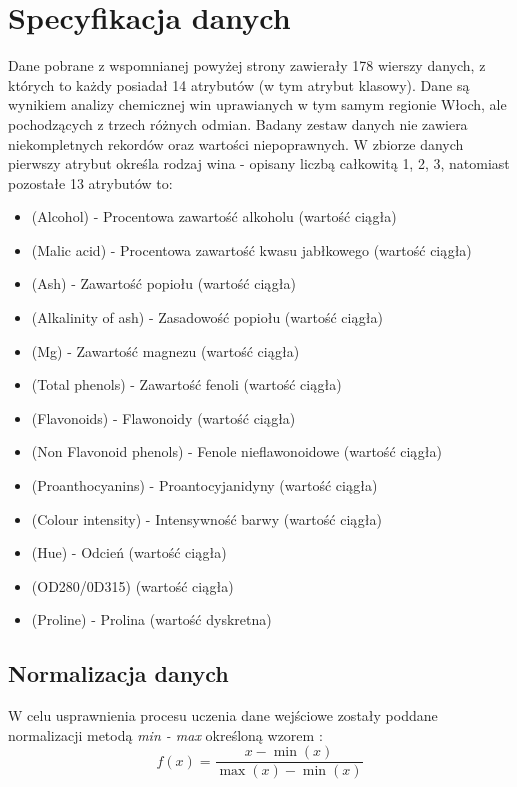 \documentclass[12pt,twoside]{article}
\begin{document}
\section{Specyfikacja danych}
Dane pobrane z wspomnianej powyżej strony zawierały 178 wierszy danych, z których to każdy posiadał 14 atrybutów (w tym atrybut klasowy). Dane
są wynikiem analizy chemicznej win uprawianych w tym samym regionie Włoch,
ale pochodzących z trzech różnych odmian. Badany zestaw danych nie zawiera
niekompletnych rekordów oraz wartości niepoprawnych. W zbiorze danych pierwszy
atrybut określa rodzaj wina - opisany liczbą całkowitą {1, 2, 3}, natomiast pozostałe
13 atrybutów to:
\begin{itemize}
\item (Alcohol) - Procentowa zawartość alkoholu (wartość ciągła)
\item (Malic acid) - Procentowa zawartość kwasu jabłkowego (wartość ciągła)
\item (Ash) - Zawartość popiołu (wartość ciągła)
\item (Alkalinity of ash) - Zasadowość popiołu (wartość ciągła)
\item (Mg) - Zawartość magnezu (wartość ciągła)
\item (Total phenols) - Zawartość fenoli (wartość ciągła)
\item (Flavonoids) - Flawonoidy (wartość ciągła)
\item (Non Flavonoid phenols) - Fenole nieflawonoidowe (wartość ciągła)
\item (Proanthocyanins) - Proantocyjanidyny (wartość ciągła)
\item (Colour intensity) - Intensywność barwy (wartość ciągła)
\item (Hue) - Odcień (wartość ciągła)
\item (OD280/0D315) (wartość ciągła)
\item (Proline) - Prolina (wartość dyskretna)
\end{itemize}
\clearpage

\subsection{Normalizacja danych}
W celu usprawnienia procesu uczenia dane wejściowe zostały poddane normalizacji metodą \textit{min - max} określoną wzorem \cite{norm}:
\begin{equation}
f(x) = \frac{x - \min{(x)}}{\max{(x)} - \min{(x)}}
\end{equation}
\end{document}
